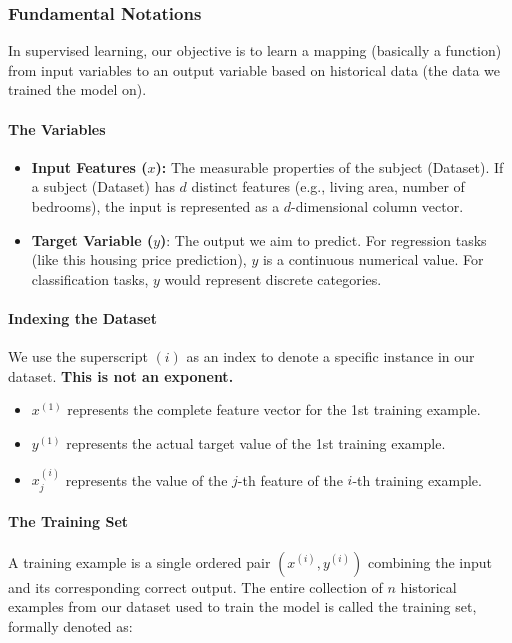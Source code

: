 \documentclass{article}
\begin{document}
\subsubsection*{Fundamental Notations}

In supervised learning, our objective is to learn a mapping (basically a function) from input variables to an output variable based on historical data (the data we trained the model on).

\paragraph*{The Variables}
\begin{itemize}
    \item \textbf{Input Features ($x$):} The measurable properties of the subject (Dataset). If a subject (Dataset) has $d$ distinct features (e.g., living area, number of bedrooms), the input is represented as a $d$-dimensional column vector.
    \item \textbf{Target Variable ($y$)}: The output we aim to predict. For regression tasks (like this housing price prediction), $y$ is a continuous numerical value. For classification tasks, $y$ would represent discrete categories.
\end{itemize}

\paragraph*{Indexing the Dataset}
We use the superscript $(i)$ as an index to denote a specific instance in our dataset. \textbf{This is not an exponent.}
\begin{itemize}
    \item $x^{(1)}$ represents the complete feature vector for the 1st training example.
    \item $y^{(1)}$ represents the actual target value of the 1st training example.
    \item $x_j^{(i)}$ represents the value of the $j$-th feature of the $i$-th training example.
\end{itemize}

\paragraph*{The Training Set}
A training example is a single ordered pair $(x^{(i)}, y^{(i)})$ combining the input and its corresponding correct output. The entire collection of $n$ historical examples from our dataset used to train the model is called the training set, formally denoted as:
\end{document}
